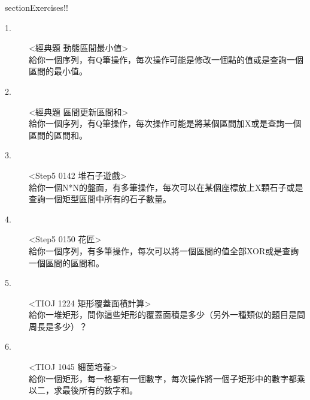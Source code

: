 \documentclass{article}
\begin{document}
section{Exercises!!}
\begin{description}
\item[ 1.]<經典題 動態區間最小值>\\
給你一個序列，有Q筆操作，每次操作可能是修改一個點的值或是查詢一個區間的最小值。
\item[ 2.]<經典題 區間更新區間和>\\
給你一個序列，有Q筆操作，每次操作可能是將某個區間加X或是查詢一個區間的區間和。
\item[ 3.]<Step5 0142 堆石子遊戲>\\
給你一個N*N的盤面，有多筆操作，每次可以在某個座標放上X顆石子或是查詢一個矩型區間中所有的石子數量。
\item[ 4.]<Step5 0150 花匠>\\
給你一個序列，有多筆操作，每次可以將一個區間的值全部XOR或是查詢一個區間的區間和。
\item[ 5.]<TIOJ 1224 矩形覆蓋面積計算>\\
給你一堆矩形，問你這些矩形的覆蓋面積是多少（另外一種類似的題目是問周長是多少）？
\item[ 6.]<TIOJ 1045 細菌培養>\\
給你一個矩形，每一格都有一個數字，每次操作將一個子矩形中的數字都乘以二，求最後所有的數字和。
\end{description}
\end{document}
